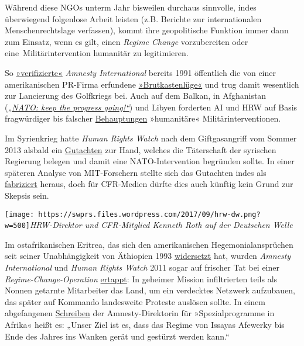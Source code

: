 Während diese NGOs unterm Jahr bisweilen durchaus sinnvolle, indes
überwiegend folgenlose Arbeit leisten (z.B. Berichte zur
inter­nationalen Menschen­rechts­lage verfassen), kommt ihre
geopolitische Funktion immer dann zum Einsatz, wenn es gilt, einen
\emph{Regime Change} vorzubereiten oder eine~Militärintervention
humanitär zu legitimieren.

So
\href{https://en.wikipedia.org/wiki/Nayirah_(testimony)}{»verifizierte«}
\emph{Amnesty International} bereits 1991 öffentlich die von einer
amerikanischen PR-Firma erfundene
\href{https://de.wikipedia.org/wiki/Brutkastenl\%C3\%BCge}{»Brutkastenlüge«}
und trug damit wesentlich zur Lancierung des Golfkriegs bei. Auch auf
dem Balkan, in Afghanistan
(\emph{\href{https://consortiumnews.com/2012/06/18/amnestys-shilling-for-us-wars/}{„NATO:
keep the progress going!``}}) und Libyen forderten AI und HRW auf Basis
fragwürdiger bis falscher
\href{https://journal-neo.org/2014/08/01/hrw-human-rights-watch-or-hypocrites-representing-washington-part-1/}{Behauptungen}
»humanitäre« Militärinterventionen.

Im Syrienkrieg hatte \emph{Human Rights Watch} nach dem Giftgasangriff
vom Sommer 2013 alsbald ein
\href{https://www.hrw.org/news/2013/09/10/syria-government-likely-culprit-chemical-attack}{Gutachten}
zur Hand, welches die Täterschaft der syrischen Regierung belegen und
damit eine NATO-Intervention begründen sollte. In einer späteren Analyse
von MIT-Forschern stellte sich das Gutachten indes als
\href{http://blauerbote.com/2017/04/01/giftgasangriffe-in-ghouta-bei-damaskus-syrien/}{fabriziert}
heraus, doch für CFR-Medien dürfte dies auch künftig kein Grund zur
Skepsis sein.

\texttt{[image: https://swprs.files.wordpress.com/2017/09/hrw-dw.png?w=500]}\emph{HRW-Direktor
und CFR-Mitglied Kenneth Roth auf der Deutschen Welle}

Im ostafrikanischen Eritrea, das sich den amerikanischen
Hegemonial­ansprüchen seit seiner Unabhängigkeit von Äthiopien 1993
\href{http://www.globalresearch.ca/u-s-sets-stage-for-libya-like-regime-change-in-eritrea-africas-cuba-2/5531735}{widersetzt}
hat, wurden \emph{Amnesty International} und \emph{Human Rights Watch}
2011 sogar auf frischer Tat bei einer \emph{Regime-Change-Operation}
\href{https://www.tesfanews.net/hillary-amnesty-hrw-and-regime-change-in-africa/}{ertappt}:
In geheimer Mission infiltrierten teils als Nonnen getarnte Mitarbeiter
das Land, um ein verdecktes Netzwerk aufzubauen, das später auf Kommando
landesweite Proteste auslösen sollte. In einem abgefangenen
\href{https://www.tesfanews.net/hillary-amnesty-hrw-and-regime-change-in-africa/}{Schreiben}
der Amnesty-Direktorin für »Spezial­programme in Afrika« heißt es:
„Unser Ziel ist es, dass das Regime von Issayas Afewerky bis Ende des
Jahres ins Wanken gerät und gestürzt werden kann.``

